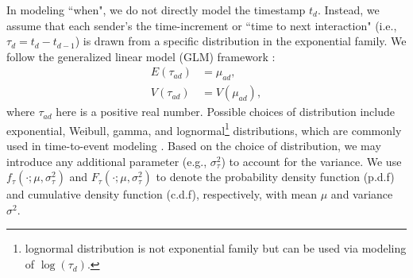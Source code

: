 \documentclass[12pt]{article}
\begin{document}
In modeling ``when", we do not directly model the timestamp $t_d$. Instead, we assume that each sender's the time-increment or ``time to next interaction" (i.e., $\tau_{d} = t_d-t_{d-1}$) is drawn from a specific distribution in the exponential family.  We follow the generalized linear model (GLM) framework \citep{nelder1972generalized}:
\begin{equation}
\begin{aligned}
E(\tau_{ad}) &= \mu_{ad},\\
V(\tau_{ad}) &= V(\mu_{ad}),
\end{aligned}
\end{equation}
where $\tau_{ad}$ here is a positive real number. Possible choices of distribution include exponential, Weibull, gamma, and lognormal\footnote{lognormal distribution is not exponential family but can be used via modeling of $\log(\tau_d)$.} distributions, which are commonly used in time-to-event modeling \citep{rao2000applied,rizopoulos2012joint}. Based on the choice of distribution, we may introduce any additional parameter (e.g., $\sigma_\tau^2$) to account for the variance. We use $f_\tau(\cdot; \mu, \sigma_\tau^2)$ and $F_\tau(\cdot; \mu, \sigma_\tau^2)$ to denote the probability density function (p.d.f) and cumulative density function (c.d.f), respectively, with mean $\mu$ and variance $\sigma^2$.
\end{document}
